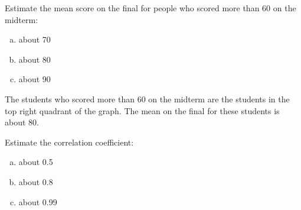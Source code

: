 \documentclass[letterpaper, landscape]{exam}
\begin{document}
  \begin{questions}
    






    \question[3] Estimate the mean score on the final for people who scored more than
      60 on the midterm:
      \label{q:exams.first}

      \begin{enumerate}[(a)]
        \item about 70
        \item about 80
        \item about 90
      \end{enumerate}

      \begin{solution}
        The students who scored more than 60 on the midterm are the students in the
        top right quadrant of the graph.  The mean on the final for these
        students is about 80.
      \end{solution}

    \question[3] Estimate the correlation coefficient:
      \begin{enumerate}[(a)]
        \item about 0.5
        \item about 0.8
        \item about 0.99
      \end{enumerate}


\end{questions}
\end{document}
